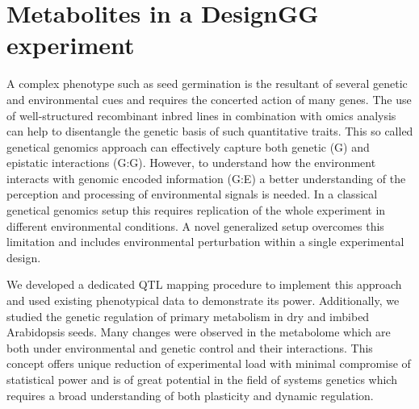 \section{Metabolites in a DesignGG experiment}
A complex phenotype such as seed germination is the resultant of several genetic and environmental 
cues and requires the concerted action of many genes. The use of well-structured recombinant inbred 
lines in combination with omics analysis can help to disentangle the genetic basis of such 
quantitative traits. This so called genetical genomics approach can effectively capture both 
genetic (G) and epistatic interactions (G:G). However, to understand how the environment interacts 
with genomic encoded information (G:E) a better understanding of the perception and processing of 
environmental signals is needed. In a classical genetical genomics setup this requires replication 
of the whole experiment in different environmental conditions. A novel generalized setup overcomes 
this limitation and includes environmental perturbation within a single experimental design. 

We developed a dedicated QTL mapping procedure to implement this approach and used existing 
phenotypical data to demonstrate its power. Additionally, we studied the genetic regulation of 
primary metabolism in dry and imbibed Arabidopsis seeds. Many changes were observed in the 
metabolome which are both under environmental and genetic control and their interactions. 
This concept offers unique reduction of experimental load with minimal compromise of statistical 
power and is of great potential in the field of systems genetics which requires a broad 
understanding of both plasticity and dynamic regulation.

